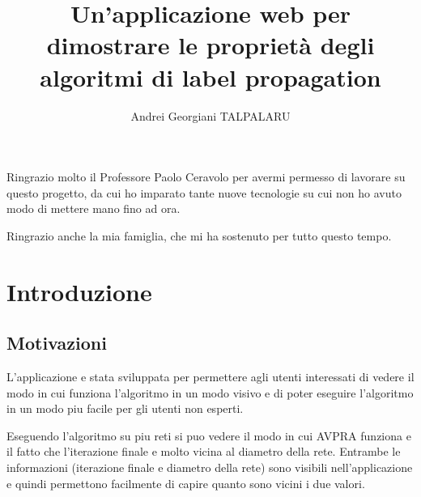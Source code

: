 \documentclass[a4paper,12pt]{report}
\begin{document}

\setcounter{secnumdepth}{5}
\setcounter{tocdepth}{5}

\title{Un'applicazione web per dimostrare le proprietà degli algoritmi di label propagation}
\author{Andrei Georgiani TALPALARU}

\beforepreface
{}
Ringrazio molto il Professore Paolo Ceravolo per avermi permesso di lavorare su questo progetto, da cui ho imparato tante nuove tecnologie su cui non ho avuto modo di mettere mano fino ad ora. 

Ringrazio anche la mia famiglia, che mi ha sostenuto per tutto questo tempo.
\afterpreface
% 
% 
%		
\chapter{Introduzione}

\section{Motivazioni}
L'applicazione e stata sviluppata per permettere agli utenti interessati di vedere il modo in cui funziona l'algoritmo in un modo visivo e di poter eseguire l'algoritmo in un modo piu facile per gli utenti non esperti. 

Eseguendo l'algoritmo su piu reti si puo vedere il modo in cui AVPRA funziona e il fatto che l'iterazione finale e molto vicina al diametro della rete. Entrambe le informazioni (iterazione finale e diametro della rete) sono visibili nell'applicazione e quindi permettono facilmente di capire quanto sono vicini i due valori.
\end{document}
